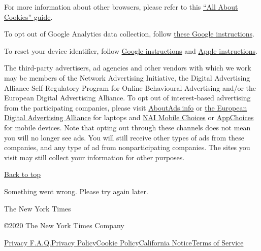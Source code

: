 For more information about other browsers, please refer to this
\href{https://www.allaboutcookies.org/manage-cookies/}{``All About
Cookies'' guide}.

To opt out of Google Analytics data collection, follow
\href{https://tools.google.com/dlpage/gaoptout}{these Google
instructions}.

To reset your device identifier, follow
\href{https://support.google.com/googleplay/android-developer/answer/6048248?hl=en}{Google
instructions} and \href{https://support.apple.com/en-us/HT205223}{Apple
instructions}.

The third-party advertisers, ad agencies and other vendors with which we
work may be members of the Network Advertising Initiative, the Digital
Advertising Alliance Self-Regulatory Program for Online Behavioural
Advertising and/or the European Digital Advertising Alliance. To opt out
of interest-based advertising from the participating companies, please
visit \href{http://optout.aboutads.info/?c=2\&lang=EN}{AboutAds.info} or
\href{http://www.youronlinechoices.eu/}{the European Digital Advertising
Alliance} for laptops and
\href{https://www.networkadvertising.org/mobile-choice/}{NAI Mobile
Choices} or \href{https://youradchoices.com/appchoices}{AppChoices} for
mobile devices. Note that opting out through these channels does not
mean you will no longer see ads. You will still receive other types of
ads from these companies, and any type of ad from nonparticipating
companies. The sites you visit may still collect your information for
other purposes.

\href{app}{Back to top}

Something went wrong. Please try again later.

The New York Times

©2020 The New York Times Company

\href{/privacy}{Privacy F.A.Q.}\href{/privacy/privacy-policy}{Privacy
Policy}\href{/privacy/cookie-policy}{Cookie
Policy}\href{/privacy/california-notice}{California
Notice}\href{https://help.nytimes3xbfgragh.onion/hc/en-us/articles/115014893428-Terms-of-service}{Terms
of Service}
